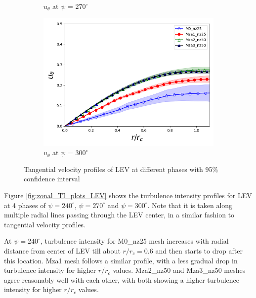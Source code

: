 \begin{figure}[H]
\begin{subfigure}[b]{0.475\textwidth}
	\caption{ $u_\theta$ at $\psi$ = $270^\circ$}
	\label{fig:zonal_utheta_270}
    \end{subfigure}
	\begin{subfigure}[b]{0.475\textwidth}
	\centering
	\includegraphics[width=1\textwidth]{figures/zonal_adapt_results/LEV/u_theta/phase_300.png}
	\caption{ $u_\theta$ at $\psi$ = $300^\circ$}
	\label{fig:zonal_utheta_300}
	\end{subfigure}
   	\caption{Tangential velocity profiles of LEV at different phases with 95\% confidence interval}
   	\label{fig:zonal_utheta_LEV}
\end{figure}



Figure \ref{fig:zonal_TI_plots_LEV} shows the turbulence intensity profiles for LEV at 4 phases of $\psi = 240^\circ$, $\psi = 270^\circ$ and $\psi = 300^\circ$. 
Note that it is taken along multiple radial lines passing through the LEV center, in a similar fashion to tangential velocity profiles.

At $\psi = 240^\circ$, turbulence intensity for M0\_nz25 mesh increases with radial distance from center of LEV till about $r/r_c = 0.6$ and then starts to drop after this location.
Mza1 mesh follows a similar profile, with a less gradual drop in turbulence intensity for higher $r/r_c $ values.
Mza2\_nz50 and Mza3\_nz50 meshes agree reasonably well with each other, with both showing a higher turbulence intensity for higher $r/r_c$ values.


